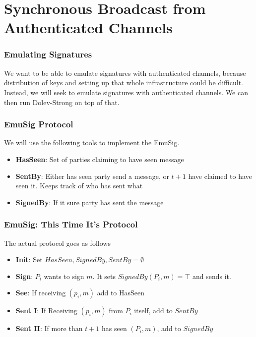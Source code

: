 \section{Synchronous Broadcast from Authenticated Channels}
    \begin{frame}
        \frametitle{Emulating Signatures}
            We want to be able to emulate signatures with authenticated channels, because distribution of keys and setting up that whole infrastructure could be difficult. Instead, we will seek to emulate signatures with authenticated channels. We can then run Dolev-Strong on top of that.
    \end{frame}
        \begin{frame}
            \frametitle{EmuSig Protocol}
                We will use the following tools to implement the EmuSig.
                \begin{itemize}
                    \item \textbf{HasSeen}: Set of parties claiming to have seen message
                    \item \textbf{SentBy}: Either has seen party send a message, or $t+1$ have claimed to have seen it. Keeps track of who has sent what
                    \item \textbf{SignedBy}: If it sure party has sent the message
                \end{itemize}
        \end{frame}
        \begin{frame}
            \frametitle{EmuSig: This Time It's Protocol}
                The actual protocol goes as follows
                \begin{itemize}
                    \item \textbf{Init}: Set $HasSeen, SignedBy, SentBy = \emptyset$
                    \item \textbf{Sign}: $P_i$ wants to sign $m$. It sets $SignedBy(P_i, m) = \top$ and sends it. 
                    \item \textbf{See}: If receiving $(p_i, m)$ add to HasSeen
                    \item \textbf{Sent I}: If Receiving $(p_i, m)$ from $P_i$ itself, add to $SentBy$
                    \item \textbf{Sent II}: If more than $t+1$ has seen $(P_i, m)$, add to $SignedBy$
                \end{itemize}
        \end{frame}
